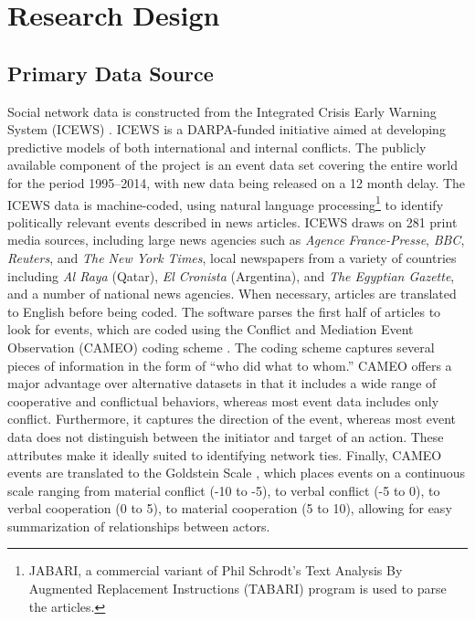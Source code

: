 
\section{Research Design}

\subsection{Primary Data Source}

Social network data is constructed from the Integrated Crisis Early Warning System (ICEWS) \citep{Boschee2015,OBrien2010}. ICEWS is a DARPA-funded initiative aimed at developing predictive models of both international and internal conflicts. The publicly available component of the project is an event data set covering the entire world for the period 1995--2014, with new data being released on a 12 month delay. The ICEWS data is machine-coded, using natural language processing\footnote{JABARI, a commercial variant of Phil Schrodt's Text Analysis By Augmented Replacement Instructions (TABARI) program \citep{Schrodt2011} is used to parse the articles.} to identify politically relevant events described in news articles. ICEWS draws on 281 print media sources, including large news agencies such as \textit{Agence France-Presse}, \textit{BBC}, \textit{Reuters}, and \textit{The New York Times}, local newspapers from a variety of countries including \textit{Al Raya} (Qatar), \textit{El Cronista} (Argentina), and \textit{The Egyptian Gazette}, and a number of national news agencies. When necessary, articles are translated to English before being coded. The software parses the first half of articles to look for events, which are coded using the Conflict and Mediation Event Observation (CAMEO) coding scheme \citep{Schrodt2007}. The coding scheme captures several pieces of information in the form of ``who did what to whom.'' CAMEO offers a major advantage over alternative datasets in that it includes a wide range of cooperative and conflictual behaviors, whereas most event data includes only conflict. Furthermore, it captures the direction of the event, whereas most event data does not distinguish between the initiator and target of an action. These attributes make it ideally suited to identifying network ties. Finally, CAMEO events are translated to the Goldstein Scale \citep{Goldstein1992}, which places events on a continuous scale ranging from material conflict (-10 to -5), to verbal conflict (-5 to 0), to verbal cooperation (0 to 5), to material cooperation (5 to 10), allowing for easy summarization of relationships between actors.

